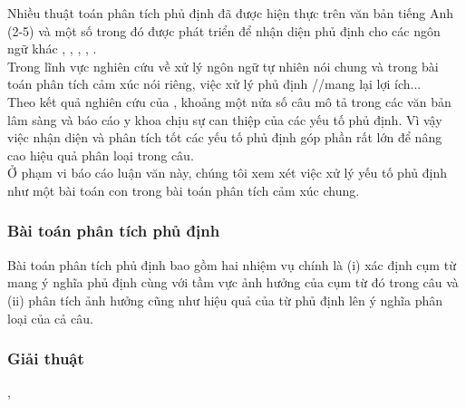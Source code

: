 Nhiều thuật toán phân tích phủ định đã được hiện thực trên văn bản tiếng Anh (2-5)\cite{Chapman2013} và một số trong đó được phát triển để nhận diện phủ định cho các ngôn ngữ khác \cite{costumero2014an}, \cite{benamara2012how}, \cite{gindl2006negation}, \cite{Chapman2013}, \cite{CruzDiaz2015}. \\


Trong lĩnh vực nghiên cứu về xử lý ngôn ngữ tự nhiên nói chung và trong bài toán phân tích cảm xúc nói riêng, việc xử lý phủ định //mang lại lợi ích... \\

Theo kết quả nghiên cứu của \cite{chapman2001evaluation}, khoảng một nửa số câu mô tả trong các văn bản lâm sàng và báo cáo y khoa chịu sự can thiệp của các yếu tố phủ định. Vì vậy việc nhận diện và phân tích tốt các yếu tố phủ định góp phần rất lớn để nâng cao hiệu quả phân loại trong câu.\\

Ở phạm vi báo cáo luận văn này, chúng tôi xem xét việc xử lý yếu tố phủ định như một bài toán con trong bài toán phân tích cảm xúc chung.
\subsubsection*{Bài toán phân tích phủ định}
Bài toán phân tích phủ định bao gồm hai nhiệm vụ chính là (i) xác định cụm từ mang ý nghĩa phủ định cùng với tầm vực ảnh hưởng của cụm từ đó trong câu và (ii) phân tích ảnh hưởng cũng như hiệu quả của từ phủ định lên ý nghĩa phân loại của cả câu.


\subsubsection*{Giải thuật}
\cite{Councill2010}, \cite{Chapman2013}